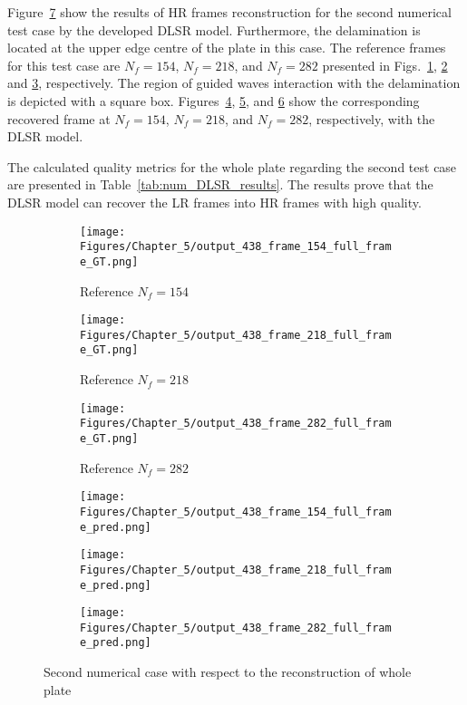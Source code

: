 Figure~\ref{fig:num_results_CS_438} show the results of HR frames reconstruction for the second numerical test case by the developed DLSR model.
Furthermore, the delamination is located at the upper edge centre of the plate in this case.
The reference frames for this test case are $N_f=154$, $N_f=218$, and $N_f=282$ presented in Figs.~\ref{fig:ref_438_full_154}, \ref{fig:ref_438_full_218} and \ref{fig:ref_438_full_282}, respectively.
The region of guided waves interaction with the delamination is depicted with a square box.
Figures~\ref{fig:pred_438_full_154}, \ref{fig:pred_438_full_218}, and \ref{fig:pred_438_full_282} show the corresponding recovered frame at $N_f=154$, $N_f=218$, and $N_f=282$, respectively, with the DLSR model.

The calculated quality metrics for the whole plate regarding the second test case are presented in Table~\ref{tab:num_DLSR_results}.
The results prove that the DLSR model can recover the LR frames into HR frames with high quality.
\begin{figure} [!ht]
	\centering
	\begin{subfigure}[b]{.32\textwidth}
		\centering
		\texttt{[image: Figures/Chapter\_5/output\_438\_frame\_154\_full\_frame\_GT.png]}
		\caption{Reference $N_f=154$}
		\label{fig:ref_438_full_154}
	\end{subfigure}
	\begin{subfigure}[b]{.32\textwidth}
		\centering
		\texttt{[image: Figures/Chapter\_5/output\_438\_frame\_218\_full\_frame\_GT.png]}
		\caption{Reference $N_f=218$}
		\label{fig:ref_438_full_218}
	\end{subfigure}
	\begin{subfigure}[b]{.32\textwidth}
		\centering
		\texttt{[image: Figures/Chapter\_5/output\_438\_frame\_282\_full\_frame\_GT.png]}
		\caption{Reference $N_f=282$}
		\label{fig:ref_438_full_282}	
	\end{subfigure}
	\begin{subfigure}[b]{.32\textwidth}
		\centering
		\texttt{[image: Figures/Chapter\_5/output\_438\_frame\_154\_full\_frame\_pred.png]}
		\caption{}
		\label{fig:pred_438_full_154}
	\end{subfigure}
	\begin{subfigure}[b]{.32\textwidth}
		\centering
		\texttt{[image: Figures/Chapter\_5/output\_438\_frame\_218\_full\_frame\_pred.png]}
		\caption{}
		\label{fig:pred_438_full_218}
	\end{subfigure}
	\begin{subfigure}[b]{.32\textwidth}
		\centering
		\texttt{[image: Figures/Chapter\_5/output\_438\_frame\_282\_full\_frame\_pred.png]}
		\caption{}
		\label{fig:pred_438_full_282}	
	\end{subfigure}
	\caption{Second numerical case with respect to the reconstruction of whole plate}
	\label{fig:num_results_CS_438}
\end{figure}

